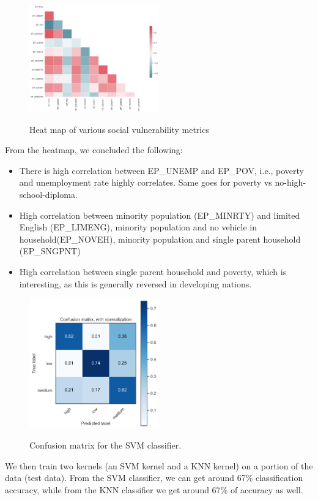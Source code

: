 \documentclass[journal,12pt,onecolumn]{IEEEtran}
\begin{document}
\begin{figure}[h]
\caption{Heat map of various social vulnerability metrics}
\centering
\includegraphics[width=0.5\textwidth]{figures/ml1.PNG}
\label{fig:sviheatmap}
\end{figure}
From the heatmap, we concluded the following:
\begin{itemize}
\item There is high correlation between EP\_UNEMP and EP\_POV, i.e., poverty and unemployment rate highly correlates. Same goes for poverty vs no-high-school-diploma.
\item High correlation between minority population (EP\_MINRTY) and limited English (EP\_LIMENG), minority population and no vehicle in household(EP\_NOVEH), minority population and single parent household (EP\_SNGPNT)
\item High correlation between single parent household and poverty, which is interesting, as this is generally reversed in developing nations.
\end{itemize}
\begin{figure}[h]
\caption{Confusion matrix for the SVM classifier.}
\centering
\includegraphics[width=0.5\textwidth]{figures/ml3.PNG}
\label{fig:svm}
\end{figure}
We then train two kernels (an SVM kernel and a KNN kernel) on a portion of the data (test data).
From the SVM classifier, we can get around 67\% classification accuracy, while from the KNN classifier we get around 67\% of accuracy as well.
\end{document}
